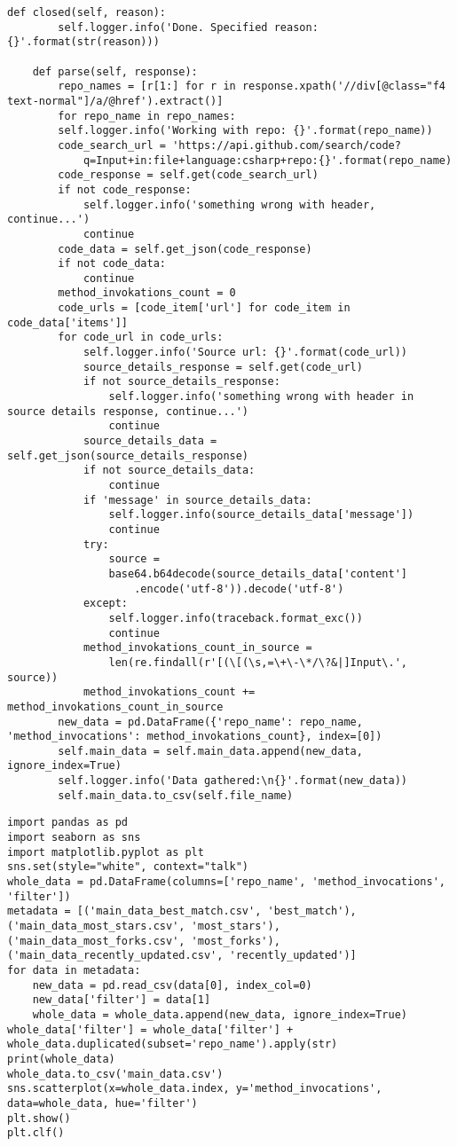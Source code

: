 \begin{lstlisting}[caption={Исходный класса обработки веб-страниц проектов с сайта GitHub.com},label=spider]
	def closed(self, reason):
		self.logger.info('Done. Specified reason: {}'.format(str(reason)))
	
	def parse(self, response):
		repo_names = [r[1:] for r in response.xpath('//div[@class="f4 text-normal"]/a/@href').extract()]
		for repo_name in repo_names:
		self.logger.info('Working with repo: {}'.format(repo_name))
		code_search_url = 'https://api.github.com/search/code?
			q=Input+in:file+language:csharp+repo:{}'.format(repo_name)
		code_response = self.get(code_search_url)
		if not code_response:
			self.logger.info('something wrong with header, continue...')
			continue
		code_data = self.get_json(code_response)
		if not code_data:
			continue
		method_invokations_count = 0
		code_urls = [code_item['url'] for code_item in code_data['items']]
		for code_url in code_urls:
			self.logger.info('Source url: {}'.format(code_url))
			source_details_response = self.get(code_url)
			if not source_details_response:
				self.logger.info('something wrong with header in source details response, continue...')
				continue
			source_details_data = self.get_json(source_details_response)
			if not source_details_data:
				continue
			if 'message' in source_details_data:
				self.logger.info(source_details_data['message'])
				continue
			try:
				source = 
				base64.b64decode(source_details_data['content']
					.encode('utf-8')).decode('utf-8')
			except:
				self.logger.info(traceback.format_exc())
				continue
			method_invokations_count_in_source = 
				len(re.findall(r'[(\[(\s,=\+\-\*/\?&|]Input\.', source))
			method_invokations_count += method_invokations_count_in_source
		new_data = pd.DataFrame({'repo_name': repo_name, 'method_invocations': method_invokations_count}, index=[0])
		self.main_data = self.main_data.append(new_data, ignore_index=True)
		self.logger.info('Data gathered:\n{}'.format(new_data))
		self.main_data.to_csv(self.file_name)
\end{lstlisting}

\begin{lstlisting}[caption={Утилита для сбора собранных spider-программой данных воедино},label=form_main_data]
import pandas as pd
import seaborn as sns
import matplotlib.pyplot as plt
sns.set(style="white", context="talk")
whole_data = pd.DataFrame(columns=['repo_name', 'method_invocations', 'filter'])
metadata = [('main_data_best_match.csv', 'best_match'),
('main_data_most_stars.csv', 'most_stars'),
('main_data_most_forks.csv', 'most_forks'),
('main_data_recently_updated.csv', 'recently_updated')]
for data in metadata:
	new_data = pd.read_csv(data[0], index_col=0)
	new_data['filter'] = data[1]
	whole_data = whole_data.append(new_data, ignore_index=True)
whole_data['filter'] = whole_data['filter'] + whole_data.duplicated(subset='repo_name').apply(str)
print(whole_data)
whole_data.to_csv('main_data.csv')
sns.scatterplot(x=whole_data.index, y='method_invocations', data=whole_data, hue='filter')
plt.show()
plt.clf()
\end{lstlisting}

